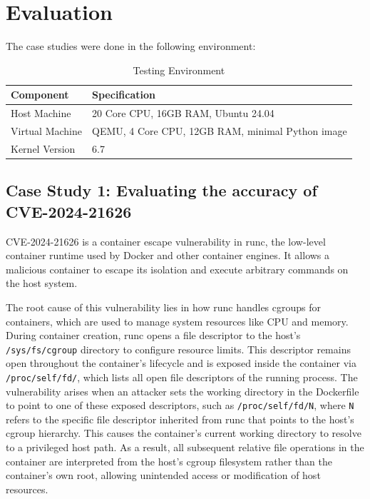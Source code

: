 \section{Evaluation}
\label{sec:evaluation}

The case studies were done in the following environment:

\begin{table}[h!]
\caption{Testing Environment}
\centering
\scriptsize %
\begin{tabular}{|l|l|} 
\hline
\textbf{Component} & \textbf{Specification} \\
\hline
Host Machine & 20 Core CPU, 16GB RAM, Ubuntu 24.04 \\
\hline
Virtual Machine & QEMU, 4 Core CPU, 12GB RAM, minimal Python image \\
\hline
Kernel Version & 6.7 \\
\hline
\end{tabular}
\end{table}

\subsection{Case Study 1: Evaluating the accuracy of CVE-2024-21626}

CVE-2024-21626 \cite{runc-cve-2024-21626} is a container escape vulnerability in runc, the low-level container runtime used by Docker and other container engines. It allows a malicious container to escape its isolation and execute arbitrary commands on the host system.

The root cause of this vulnerability lies in how runc handles cgroups for containers, which are used to manage system resources like CPU and memory. During container creation, runc opens a file descriptor to the host's \texttt{/sys/fs/cgroup} directory to configure resource limits. This descriptor remains open throughout the container’s lifecycle and is exposed inside the container via \texttt{/proc/self/fd/}, which lists all open file descriptors of the running process. The vulnerability arises when an attacker sets the working directory in the Dockerfile to point to one of these exposed descriptors, such as \texttt{/proc/self/fd/N}, where \texttt{N} refers to the specific file descriptor inherited from runc that points to the host’s cgroup hierarchy. This causes the container’s current working directory to resolve to a privileged host path. As a result, all subsequent relative file operations in the container are interpreted from the host’s cgroup filesystem rather than the container’s own root, allowing unintended access or modification of host resources.

